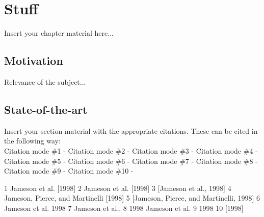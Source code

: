 
\chapter{Stuff}
\label{chapter:introduction}

Insert your chapter material here...

\section{Motivation}
\label{section:motivation}

Relevance of the subject...


\section{State-of-the-art}
\label{section:state}

Insert your section material with the appropriate citations.
These can be cited in the following way: \\

Citation mode \#1 - \quad \cite{jameson:adjointns}
Citation mode \#2 - \quad \citet{jameson:adjointns}
Citation mode \#3 - \quad \citep{jameson:adjointns}
Citation mode \#4 - \quad \citet*{jameson:adjointns}
Citation mode \#5 - \quad \citep*{jameson:adjointns}
Citation mode \#6 - \quad \citealt{jameson:adjointns}
Citation mode \#7 - \quad \citealp{jameson:adjointns}
Citation mode \#8 - \quad \citeauthor{jameson:adjointns}
Citation mode \#9 - \quad \citeyear{jameson:adjointns}
Citation mode \#10 - \quad \citeyearpar{jameson:adjointns}

1	Jameson et al. [1998]
2	Jameson et al. [1998]
3	[Jameson et al., 1998]
4	Jameson, Pierce, and Martinelli [1998]
5	[Jameson, Pierce, and Martinelli, 1998]
6	Jameson et al. 1998
7	Jameson et al.,
8	1998 Jameson et al.
9	1998
10	[1998]


